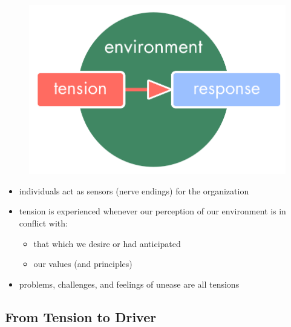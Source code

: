 \begin{figure}[htbp]
\centering
\includegraphics[keepaspectratio,width=\textwidth,height=0.75\textheight]{img/tension-driver-domain/tension-response.png}
\end{figure}

\begin{itemize}
\item individuals act as sensors (nerve endings) for the organization

\item tension is experienced whenever our perception of our environment is in conflict with:

\begin{itemize}
\item that which we desire or had anticipated

\item our values (and principles)

\end{itemize}

\item problems, challenges, and feelings of unease are all tensions

\end{itemize}

\subsection{From Tension to Driver}
\label{fromtensiontodriver}

